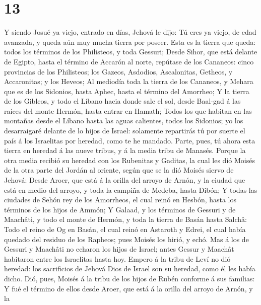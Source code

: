 \hypertarget{section-12}{%
\section{13}\label{section-12}}

 Y siendo Josué ya viejo, entrado en días, Jehová le dijo:
Tú eres ya viejo, de edad avanzada, y queda aún muy mucha tierra por
poseer.  Esta es la tierra que queda: todos los términos de
los Philisteos, y toda Gessuri;  Desde Sihor, que está
delante de Egipto, hasta el término de Accarón al norte, repútase de los
Cananeos: cinco provincias de los Philisteos; los Gazeos, Asdodios,
Ascalonitas, Getheos, y Accaronitas; y los Heveos;  Al
mediodía toda la tierra de los Cananeos, y Mehara que es de los
Sidonios, hasta Aphec, hasta el término del Amorrheo;  Y la
tierra de los Gibleos, y todo el Líbano hacia donde sale el sol, desde
Baal-gad á las raíces del monte Hermón, hasta entrar en Hamath;
 Todos los que habitan en las montañas desde el Líbano hasta
las aguas calientes, todos los Sidonios; yo los desarraigaré delante de
lo hijos de Israel: solamente repartirás tú por suerte el país á los
Israelitas por heredad, como te he mandado.  Parte, pues, tú
ahora esta tierra en heredad á las nueve tribus, y á la media tribu de
Manasés.  Porque la otra media recibió su heredad con los
Rubenitas y Gaditas, la cual les dió Moisés de la otra parte del Jordán
al oriente, según que se la dió Moisés siervo de Jehová: 
Desde Aroer, que está á la orilla del arroyo de Arnón, y la ciudad que
está en medio del arroyo, y toda la campiña de Medeba, hasta Dibón;
 Y todas las ciudades de Sehón rey de los Amorrheos, el
cual reinó en Hesbón, hasta los términos de los hijos de Ammón;
 Y Galaad, y los términos de Gessuri y de Maachâti, y todo
el monte de Hermón, y toda la tierra de Basán hasta Salchâ:
 Todo el reino de Og en Basán, el cual reinó en Astaroth y
Edrei, el cual había quedado del residuo de los Rapheos; pues Moisés los
hirió, y echó.  Mas á los de Gessuri y Maachâti no echaron
los hijos de Israel; antes Gessur y Maachât habitaron entre los
Israelitas hasta hoy.  Empero á la tribu de Leví no dió
heredad: los sacrificios de Jehová Dios de Israel son su heredad, como
él les había dicho.  Dió, pues, Moisés á la tribu de los
hijos de Rubén conforme á sus familias:  Y fué el término
de ellos desde Aroer, que está á la orilla del arroyo de Arnón, y la
